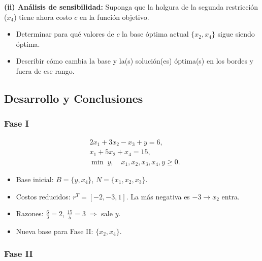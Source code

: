 \documentclass{article}
\begin{document}
\medskip

\textbf{(ii) Análisis de sensibilidad:} Suponga que la holgura de la segunda restricción ($x_4$) tiene ahora costo $c$ en la función objetivo.  
\begin{itemize}
  \item Determinar para qué valores de $c$ la base óptima actual $\{x_2,x_4\}$ sigue siendo óptima.
  \item Describir cómo cambia la base y la(s) solución(es) óptima(s) en los bordes y fuera de ese rango.
\end{itemize}

\newpage
\subsection*{Desarrollo y Conclusiones}

\subsubsection*{Fase I}

\begin{align*}
&2x_1 + 3x_2 - x_3 + y = 6,\\
&x_1 + 5x_2 + x_4 = 15,\\
&\min\;y,\quad x_1,x_2,x_3,x_4,y\ge0.
\end{align*}

\begin{itemize}
  \item Base inicial: $B=\{y,x_4\}$, $N=\{x_1,x_2,x_3\}$.
  \item Costos reducidos: $r^T = [-2,-3,1]$. La más negativa es $-3\to x_2$ entra.
  \item Razones: $\frac{6}{3}=2$, $\frac{15}{5}=3\;\Rightarrow$ sale $y$.
  \item Nueva base para Fase II: $\{x_2,x_4\}$.
\end{itemize}

\subsubsection*{Fase II}
\end{document}
